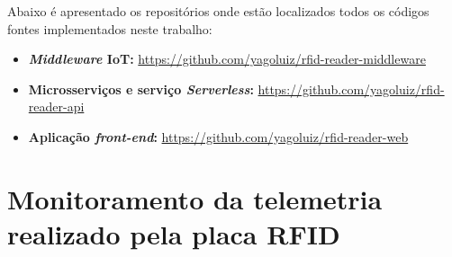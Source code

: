 \label{apendice}

Abaixo é apresentado os repositórios onde estão localizados todos os códigos fontes implementados neste trabalho:

\begin{itemize}
    \item \textbf{\textit{Middleware} \acrshort{IoT}:} \url{https://github.com/yagoluiz/rfid-reader-middleware}
    \item \textbf{Microsserviços e serviço \textit{Serverless}:} \url{https://github.com/yagoluiz/rfid-reader-api}
    \item \textbf{Aplicação \textit{front-end}:} \url{https://github.com/yagoluiz/rfid-reader-web}
\end{itemize}

\section{Monitoramento da telemetria realizado pela placa RFID}

